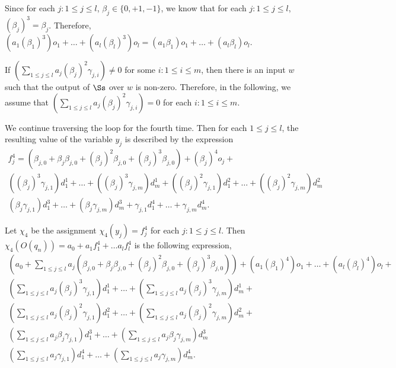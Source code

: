 Since for each $j: 1 \le j \le l$, $\beta_j \in \{0,+1,-1\}$, we know that for each $j: 1 \le j \le l$, $(\beta_j)^3=\beta_j$. Therefore, $(a_1 (\beta_1)^3) o_1 + \dots + (a_l (\beta_l)^3) o_l = (a_1 \beta_1) o_1 + \dots + (a_l \beta_l) o_l$.

If $(\sum \limits_{1 \le j \le l} a_j (\beta_j)^2\gamma_{j,i}) \neq 0$ for some $i: 1 \le i \le m$, then there is an input $w$ such that the output of $\Ss$ over $w$ is non-zero. Therefore, in the following, we assume that $(\sum \limits_{1 \le j \le l} a_j (\beta_j)^2\gamma_{j,i}) = 0$ for each $i: 1 \le i \le m$.


We continue traversing the loop for the fourth time. Then for each $1 \le j \le l$, the resulting value of the variable $y_j$ is described by the expression 
\[
\begin{array}{l}
f^4_{j} = (\beta_{j,0} + \beta_{j} \beta_{j,0} + (\beta_j)^2 \beta_{j,0}+(\beta_j)^3 \beta_{j,0}) + (\beta_{j})^4 o_{j} +
\\
((\beta_{j})^3\gamma_{j,1}) d^1_1 +\dots + ((\beta_{j})^3 \gamma_{j,m}) d^1_m  + 
((\beta_{j})^2\gamma_{j,1}) d^2_1 +\dots + ((\beta_{j})^2 \gamma_{j,m}) d^2_m \\
(\beta_j \gamma_{j,1}) d^3_1 + \dots + (\beta_j \gamma_{j,m}) d^3_m + \gamma_{j,1} d^4_1 + \dots + \gamma_{j,m} d^4_m.
\end{array}
\]

Let $\chi_4$ be the assignment $\chi_4(y_j)=f^4_j$ for each $j: 1\le j \le l$.
Then $\chi_4(O(q_n)) = a_0+ a_1 f^4_1 + \dots a_l f^4_l$ is the following expression,
\[
\begin{array}{l}
(a_0 + \sum \limits_{1 \le j \le l} a_j (\beta_{j,0} + \beta_{j} \beta_{j,0} + (\beta_j)^2 \beta_{j,0} + (\beta_j)^3 \beta_{j,0})) +  (a_1 (\beta_1)^4) o_1 + \dots + (a_l (\beta_l)^4) o_l + \\
 (\sum \limits_{1 \le j \le l} a_j (\beta_{j})^3\gamma_{j,1}) d^1_1 + \dots + (\sum \limits_{1 \le j \le l} a_j (\beta_{j})^3\gamma_{j,m}) d^1_m + \\
 (\sum \limits_{1 \le j \le l} a_j (\beta_{j})^2\gamma_{j,1}) d^2_1 + \dots + (\sum \limits_{1 \le j \le l} a_j (\beta_{j})^2\gamma_{j,m}) d^2_m + \\
(\sum \limits_{1 \le j \le l} a_j \beta_j \gamma_{j,1}) d^3_1 + \dots + (\sum \limits_{1 \le j \le l} a_j \beta_j \gamma_{j,m}) d^3_m \\
(\sum \limits_{1 \le j \le l} a_j \gamma_{j,1}) d^4_1 + \dots + (\sum \limits_{1 \le j \le l} a_j \gamma_{j,m}) d^4_m. 
\end{array}
\]

